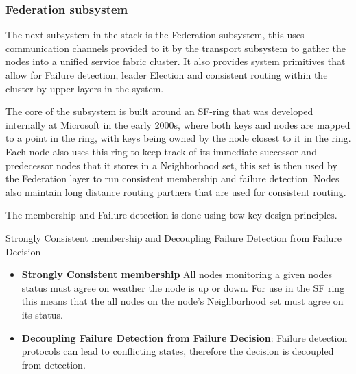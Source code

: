\documentclass[a4paper,10pt,titlepage]{report}
\begin{document}
    \subsubsection{Federation subsystem}

    The next subsystem in the stack is the Federation subsystem, this uses communication channels provided to it by the transport subsystem to gather the nodes into a unified service fabric cluster. It also provides system primitives that allow for Failure detection, leader Election and consistent routing within the cluster by upper layers in the system.\\
    \vspace{5mm}

    The core of the subsystem is built around an SF-ring that was developed internally at Microsoft in the early 2000s, where both keys and nodes are mapped to a point in the ring, with keys being owned by the node closest to it in the ring. Each node also uses this ring to keep track of its immediate successor and predecessor nodes that it stores in a Neighborhood set, this set is then used by the Federation layer to run consistent membership and failure detection. Nodes also maintain long distance routing partners that are used for consistent routing.\\
    \vspace{5mm}

    The membership and Failure detection is done using tow key design principles.\\
    \vspace{5mm}

    Strongly Consistent membership and Decoupling Failure Detection from Failure Decision\\
    \vspace{5mm}

    \begin{itemize}
        \item \textbf{Strongly Consistent membership} All nodes monitoring a given nodes status must agree on weather the node is up or down. For use in the SF ring this means that the all nodes on the node's Neighborhood set must agree on its status.
        \item \textbf{Decoupling Failure Detection from Failure Decision}: Failure detection protocols can lead to conflicting states, therefore the decision is decoupled from detection.
    \end{itemize}
    \vspace{5mm}
\end{document}
